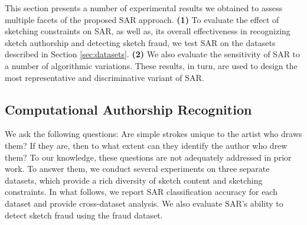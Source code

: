 This section presents a number of experimental results we obtained to assess multiple facets of the proposed SAR approach. \textbf{(1)} To evaluate the effect of sketching constraints on SAR, as well as, its overall effectiveness in recognizing sketch authorship and detecting sketch fraud, we test SAR on the datasets described in Section \ref{sec:datasets}. \textbf{(2)} We also evaluate the sensitivity of SAR to a number of algorithmic variations. These results, in turn, are used to design the most representative and discriminative variant of SAR. %

\vspace{-2mm}
\subsection{Computational Authorship Recognition}\label{subsec:recognition}
\vspace{-2mm}
We ask the following questions: Are simple strokes unique to the artist who draws them?  If they are, then to what extent can they identify the author who drew them? To our knowledge, these questions are not adequately addressed in prior work. To answer them, we conduct several experiments on three separate datasets, which provide a rich diversity of sketch content and sketching constraints. In what follows, we report SAR classification accuracy for each dataset and provide cross-dataset analysis. We also evaluate SAR's ability to detect sketch fraud using the fraud dataset.



